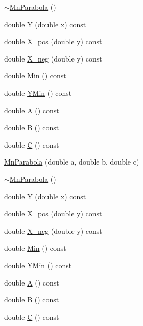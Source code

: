 \begin{DoxyCompactItemize}
\item 
\mbox{\hyperlink{classROOT_1_1Minuit2_1_1MnParabola_ae5d6b58d6c4f02ad9b34bb397157f9e2}{$\sim$\+Mn\+Parabola}} ()
\item 
double \mbox{\hyperlink{classROOT_1_1Minuit2_1_1MnParabola_af429c12e92f120e38f75147fd3fc857c}{Y}} (double x) const
\item 
double \mbox{\hyperlink{classROOT_1_1Minuit2_1_1MnParabola_a2b4623df00488ca3d4175eb92123066e}{X\+\_\+pos}} (double y) const
\item 
double \mbox{\hyperlink{classROOT_1_1Minuit2_1_1MnParabola_a16f7f02dd1cb070e89fb007331066ee3}{X\+\_\+neg}} (double y) const
\item 
double \mbox{\hyperlink{classROOT_1_1Minuit2_1_1MnParabola_ab3c7e51f6276d9ebf6d28fe965914bc8}{Min}} () const
\item 
double \mbox{\hyperlink{classROOT_1_1Minuit2_1_1MnParabola_a7efab0e0a9902151738605a552adef41}{Y\+Min}} () const
\item 
double \mbox{\hyperlink{classROOT_1_1Minuit2_1_1MnParabola_ae5ca4bea19ba4c0243ca70bb6e55e827}{A}} () const
\item 
double \mbox{\hyperlink{classROOT_1_1Minuit2_1_1MnParabola_a878824850afd7ec98fd8685bec89784b}{B}} () const
\item 
double \mbox{\hyperlink{classROOT_1_1Minuit2_1_1MnParabola_a9ca632ea018da194e08eb18d4b0059f9}{C}} () const
\item 
\mbox{\hyperlink{classROOT_1_1Minuit2_1_1MnParabola_ae6e3ffd6c7a3d586d8c72ae35ead4448}{Mn\+Parabola}} (double a, double b, double c)
\item 
\mbox{\hyperlink{classROOT_1_1Minuit2_1_1MnParabola_ae5d6b58d6c4f02ad9b34bb397157f9e2}{$\sim$\+Mn\+Parabola}} ()
\item 
double \mbox{\hyperlink{classROOT_1_1Minuit2_1_1MnParabola_af429c12e92f120e38f75147fd3fc857c}{Y}} (double x) const
\item 
double \mbox{\hyperlink{classROOT_1_1Minuit2_1_1MnParabola_a2b4623df00488ca3d4175eb92123066e}{X\+\_\+pos}} (double y) const
\item 
double \mbox{\hyperlink{classROOT_1_1Minuit2_1_1MnParabola_a16f7f02dd1cb070e89fb007331066ee3}{X\+\_\+neg}} (double y) const
\item 
double \mbox{\hyperlink{classROOT_1_1Minuit2_1_1MnParabola_ab3c7e51f6276d9ebf6d28fe965914bc8}{Min}} () const
\item 
double \mbox{\hyperlink{classROOT_1_1Minuit2_1_1MnParabola_a7efab0e0a9902151738605a552adef41}{Y\+Min}} () const
\item 
double \mbox{\hyperlink{classROOT_1_1Minuit2_1_1MnParabola_ae5ca4bea19ba4c0243ca70bb6e55e827}{A}} () const
\item 
double \mbox{\hyperlink{classROOT_1_1Minuit2_1_1MnParabola_a878824850afd7ec98fd8685bec89784b}{B}} () const
\item 
double \mbox{\hyperlink{classROOT_1_1Minuit2_1_1MnParabola_a9ca632ea018da194e08eb18d4b0059f9}{C}} () const
\end{DoxyCompactItemize}


